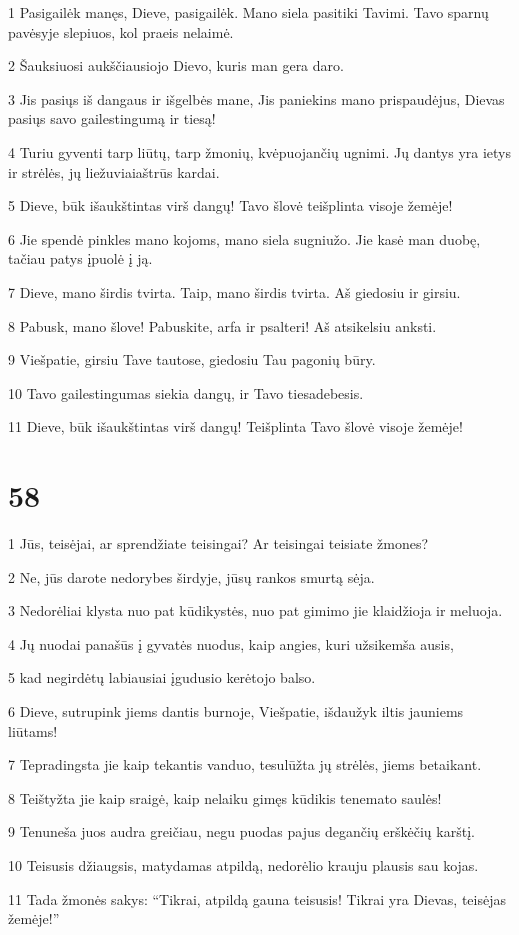 \par 1 Pasigailėk manęs, Dieve, pasigailėk. Mano siela pasitiki Tavimi. Tavo sparnų pavėsyje slepiuos, kol praeis nelaimė. 
\par 2 Šauksiuosi aukščiausiojo Dievo, kuris man gera daro. 
\par 3 Jis pasiųs iš dangaus ir išgelbės mane, Jis paniekins mano prispaudėjus, Dievas pasiųs savo gailestingumą ir tiesą! 
\par 4 Turiu gyventi tarp liūtų, tarp žmonių, kvėpuojančių ugnimi. Jų dantys yra ietys ir strėlės, jų liežuviai­aštrūs kardai. 
\par 5 Dieve, būk išaukštintas virš dangų! Tavo šlovė teišplinta visoje žemėje! 
\par 6 Jie spendė pinkles mano kojoms, mano siela sugniužo. Jie kasė man duobę, tačiau patys įpuolė į ją. 
\par 7 Dieve, mano širdis tvirta. Taip, mano širdis tvirta. Aš giedosiu ir girsiu. 
\par 8 Pabusk, mano šlove! Pabuskite, arfa ir psalteri! Aš atsikelsiu anksti. 
\par 9 Viešpatie, girsiu Tave tautose, giedosiu Tau pagonių būry. 
\par 10 Tavo gailestingumas siekia dangų, ir Tavo tiesa­debesis. 
\par 11 Dieve, būk išaukštintas virš dangų! Teišplinta Tavo šlovė visoje žemėje!



\chapter{58}


\par 1 Jūs, teisėjai, ar sprendžiate teisingai? Ar teisingai teisiate žmones? 
\par 2 Ne, jūs darote nedorybes širdyje, jūsų rankos smurtą sėja. 
\par 3 Nedorėliai klysta nuo pat kūdikystės, nuo pat gimimo jie klaidžioja ir meluoja. 
\par 4 Jų nuodai panašūs į gyvatės nuodus, kaip angies, kuri užsikemša ausis, 
\par 5 kad negirdėtų labiausiai įgudusio kerėtojo balso. 
\par 6 Dieve, sutrupink jiems dantis burnoje, Viešpatie, išdaužyk iltis jauniems liūtams! 
\par 7 Tepradingsta jie kaip tekantis vanduo, tesulūžta jų strėlės, jiems betaikant. 
\par 8 Teištyžta jie kaip sraigė, kaip nelaiku gimęs kūdikis tenemato saulės! 
\par 9 Tenuneša juos audra greičiau, negu puodas pajus degančių erškėčių karštį. 
\par 10 Teisusis džiaugsis, matydamas atpildą, nedorėlio krauju plausis sau kojas. 
\par 11 Tada žmonės sakys: “Tikrai, atpildą gauna teisusis! Tikrai yra Dievas, teisėjas žemėje!”




